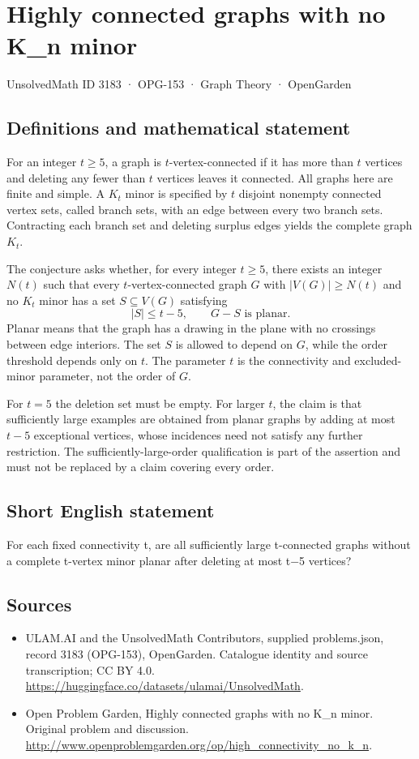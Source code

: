 \documentclass[11pt,a4paper]{article}
\begin{document}
\section*{Highly connected graphs with no K\_n minor}\label{3183}
{\small UnsolvedMath ID 3183 · OPG-153 · Graph Theory · OpenGarden}
\subsection{Definitions and mathematical statement}
For an integer $t\ge5$, a graph is $t$-vertex-connected if it has more than $t$ vertices and deleting any fewer than $t$ vertices leaves it connected. All graphs here are finite and simple. A $K_t$ minor is specified by $t$ disjoint nonempty connected vertex sets, called branch sets, with an edge between every two branch sets. Contracting each branch set and deleting surplus edges yields the complete graph $K_t$.

The conjecture asks whether, for every integer $t\ge5$, there exists an integer $N(t)$ such that every $t$-vertex-connected graph $G$ with $|V(G)|\ge N(t)$ and no $K_t$ minor has a set $S\subseteq V(G)$ satisfying
\[
             |S|\le t-5,\qquad G-S\text{ is planar}.
\]
Planar means that the graph has a drawing in the plane with no crossings between edge interiors. The set $S$ is allowed to depend on $G$, while the order threshold depends only on $t$. The parameter $t$ is the connectivity and excluded-minor parameter, not the order of $G$.

For $t=5$ the deletion set must be empty. For larger $t$, the claim is that sufficiently large examples are obtained from planar graphs by adding at most $t-5$ exceptional vertices, whose incidences need not satisfy any further restriction. The sufficiently-large-order qualification is part of the assertion and must not be replaced by a claim covering every order.
\subsection{Short English statement}
For each fixed connectivity t, are all sufficiently large t-connected graphs without a complete t-vertex minor planar after deleting at most t−5 vertices?
\subsection{Sources}
\begin{itemize}
\item[S1] ULAM.AI and the UnsolvedMath Contributors, supplied problems.json, record 3183 (OPG-153), OpenGarden. Catalogue identity and source transcription; CC BY 4.0.
\url{https://huggingface.co/datasets/ulamai/UnsolvedMath}.
\item[S2] Open Problem Garden, Highly connected graphs with no K\_n minor. Original problem and discussion.
\url{http://www.openproblemgarden.org/op/high_connectivity_no_k_n}.
\end{itemize}
\end{document}
